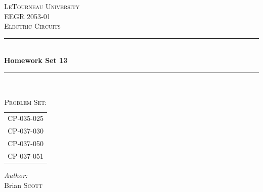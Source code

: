 \begin{titlepage}
\newcommand{\HRule}{\rule{\linewidth}{0.4mm}} %

\center %
 

\textsc{\LARGE LeTourneau University}\\[1.5cm] %
\textsc{\Large EEGR 2053-01}\\[0.5cm] %
\textsc{\large Electric Circuits}\\[0.5cm] %


\HRule \\[0.4cm]
{ \huge \bfseries Homework Set 13}\\[0.2cm] %
\HRule \\[1.5cm]
 

\begin{table}[h]
\large
\ttfamily
\centering
\caption*{\textsc{\large Problem Set:}}
\label{tab:probset}
\begin{tabular}{l}
CP-035-025 \\
CP-037-030 \\
CP-037-050 \\ 
CP-037-051 \\[1.5cm]
\end{tabular}
\end{table}


\Large \emph{Author:}\\
Brian \textsc{Scott}\\[1cm] %


\end{titlepage}
